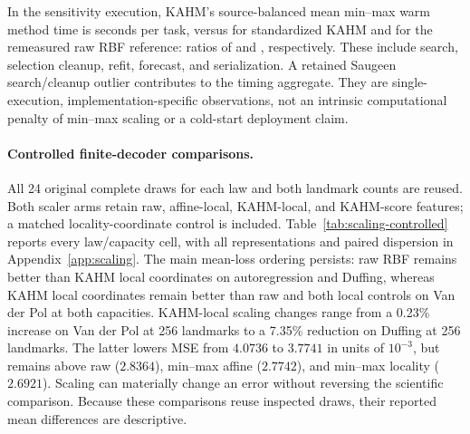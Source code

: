 In the sensitivity execution, KAHM's source-balanced mean min--max warm method time is
\ScalingNaturalKahmMinmaxTime{} seconds per task, versus
\ScalingNaturalKahmStandardTime{} for standardized KAHM and
\ScalingNaturalRawTime{} for the remeasured raw RBF reference:
ratios of \ScalingNaturalKahmCostRatioStandard{} and
\ScalingNaturalKahmCostRatioRaw{}, respectively. These include search,
selection cleanup, refit, forecast, and serialization. A retained Saugeen
search/cleanup outlier contributes to the timing aggregate. They are
single-execution, implementation-specific observations, not an intrinsic
computational penalty of min--max scaling or a cold-start deployment claim.

\paragraph{Controlled finite-decoder comparisons.}
All 24 original complete draws for each law and both landmark counts are
reused. Both scaler arms retain raw, affine-local, KAHM-local, and KAHM-score
features; a matched locality-coordinate control is included.
Table~\ref{tab:scaling-controlled} reports every law/capacity cell, with
all representations and paired dispersion in Appendix~\ref{app:scaling}.
The main mean-loss ordering persists: raw RBF remains better than KAHM
local coordinates on autoregression and Duffing, whereas KAHM local coordinates remain better
than raw and both local controls on Van der Pol at both capacities.
KAHM-local scaling changes range from a 0.23\% increase on Van der Pol
at 256 landmarks to a 7.35\% reduction on Duffing at 256 landmarks.
The latter lowers MSE from $4.0736$ to $3.7741$ in units of $10^{-3}$,
but remains above raw ($2.8364$), min--max affine ($2.7742$), and min--max
locality ($2.6921$). Scaling can materially change an error without reversing
the scientific comparison. Because these comparisons reuse inspected draws, their reported
mean differences are descriptive.


\FloatBarrier

